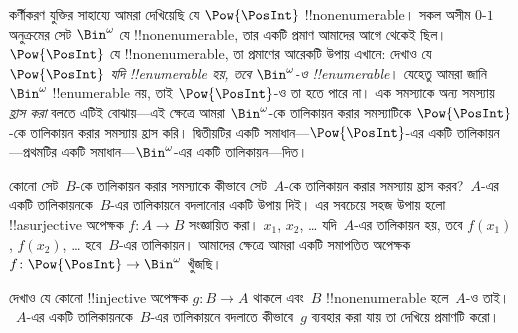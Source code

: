 \documentclass[../../../include/open-logic-section]{subfiles}
\begin{document}



কর্ণীকরণ যুক্তির সাহায্যে আমরা দেখিয়েছি যে $\Pow{\PosInt}$ !!{nonenumerable}। সকল অসীম $0$-$1$ অনুক্রমের সেট $\Bin^\omega$ যে !!{nonenumerable}, তার একটি প্রমাণ আমাদের আগে থেকেই ছিল। $\Pow{\PosInt}$ যে !!{nonenumerable}, তা প্রমাণের আরেকটি উপায় এখানে: দেখাও যে \emph{$\Pow{\PosInt}$ যদি !!{enumerable} হয়, তবে $\Bin^\omega$-ও !!{enumerable}}। যেহেতু আমরা জানি $\Bin^\omega$ !!{enumerable} নয়, তাই $\Pow{\PosInt}$-ও তা হতে পারে না। এক সমস্যাকে অন্য সমস্যায় \emph{হ্রাস করা} বলতে এটিই বোঝায়—এই ক্ষেত্রে আমরা $\Bin^\omega$-কে তালিকায়ন করার সমস্যাটিকে $\Pow{\PosInt}$-কে তালিকায়ন করার সমস্যায় হ্রাস করি। দ্বিতীয়টির একটি সমাধান—$\Pow{\PosInt}$-এর একটি তালিকায়ন—প্রথমটির একটি সমাধান—$\Bin^\omega$-এর একটি তালিকায়ন—দিত।

কোনো সেট~$B$-কে তালিকায়ন করার সমস্যাকে কীভাবে সেট~$A$-কে তালিকায়ন করার সমস্যায় হ্রাস করব?~$A$-এর একটি তালিকায়নকে~$B$-এর তালিকায়নে বদলানোর একটি উপায় দিই। এর সবচেয়ে সহজ উপায় হলো !!a{surjective} অপেক্ষক $f\colon A \to B$ সংজ্ঞায়িত করা। $x_1$, $x_2$, \dots{} যদি~$A$-এর তালিকায়ন হয়, তবে $f(x_1)$, $f(x_2)$, \dots{} হবে~$B$-এর তালিকায়ন। আমাদের ক্ষেত্রে আমরা একটি সমাপতিত অপেক্ষক $f\colon \Pow{\PosInt} \to \Bin^\omega$ খুঁজছি।

\begin{prob}
দেখাও যে কোনো !!{injective} অপেক্ষক $g\colon B \to A$ থাকলে এবং~$B$ !!{nonenumerable} হলে~$A$-ও তাই।~$A$-এর একটি তালিকায়নকে~$B$-এর তালিকায়নে বদলাতে কীভাবে~$g$ ব্যবহার করা যায় তা দেখিয়ে প্রমাণটি করো।
\end{prob}
\end{document}

